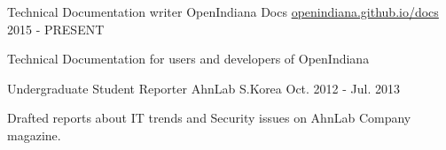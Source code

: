 


\begin{cventries}


\cventry
{Technical Documentation writer} %
{OpenIndiana Docs} %
{\href{https://openindiana.github.io/oi-docs/}{openindiana.github.io/docs}} %
{2015 - PRESENT} %
{ %
\begin{cvitems}
\item {Technical Documentation for users and developers of OpenIndiana}
\end{cvitems}
}


\cventry
{Undergraduate Student Reporter} %
{AhnLab} %
{S.Korea} %
{Oct. 2012 - Jul. 2013} %
{ %
\begin{cvitems}
\item {Drafted reports about IT trends and Security issues on AhnLab Company magazine.}
\end{cvitems}
}


\end{cventries}
